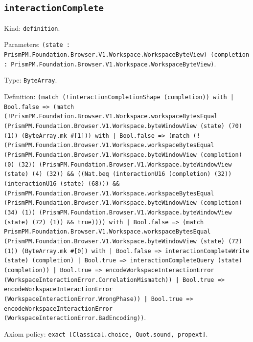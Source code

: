 \documentclass[11pt]{article}
\begin{document}
\subsection*{\texttt{interactionComplete}}
\noindent Kind: \texttt{definition}.\par
\noindent Parameters: \texttt{(state : PrismPM.Foundation.Browser.V1.Workspace.WorkspaceByteView) (completion : PrismPM.Foundation.Browser.V1.Workspace.WorkspaceByteView)}.\par
\noindent Type: \texttt{ByteArray}.\par
\noindent Definition: \texttt{(match (!interactionCompletionShape (completion)) with | Bool.false => (match (!PrismPM.Foundation.Browser.V1.Workspace.workspaceBytesEqual (PrismPM.Foundation.Browser.V1.Workspace.byteWindowView (state) (70) (1)) (ByteArray.mk \#[1])) with | Bool.false => (match (!(PrismPM.Foundation.Browser.V1.Workspace.workspaceBytesEqual (PrismPM.Foundation.Browser.V1.Workspace.byteWindowView (completion) (0) (32)) (PrismPM.Foundation.Browser.V1.Workspace.byteWindowView (state) (4) (32)) \&\& ((Nat.beq (interactionU16 (completion) (32)) (interactionU16 (state) (68))) \&\& (PrismPM.Foundation.Browser.V1.Workspace.workspaceBytesEqual (PrismPM.Foundation.Browser.V1.Workspace.byteWindowView (completion) (34) (1)) (PrismPM.Foundation.Browser.V1.Workspace.byteWindowView (state) (72) (1)) \&\& true)))) with | Bool.false => (match PrismPM.Foundation.Browser.V1.Workspace.workspaceBytesEqual (PrismPM.Foundation.Browser.V1.Workspace.byteWindowView (state) (72) (1)) (ByteArray.mk \#[0]) with | Bool.false => interactionCompleteWrite (state) (completion) | Bool.true => interactionCompleteQuery (state) (completion)) | Bool.true => encodeWorkspaceInteractionError (WorkspaceInteractionError.CorrelationMismatch)) | Bool.true => encodeWorkspaceInteractionError (WorkspaceInteractionError.WrongPhase)) | Bool.true => encodeWorkspaceInteractionError (WorkspaceInteractionError.BadEncoding))}.\par
\noindent Axiom policy: \texttt{exact [Classical.choice, Quot.sound, propext]}.\par
\end{document}
